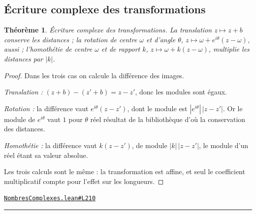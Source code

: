 \documentclass[11pt,a4paper]{article}
\theoremstyle{definition}
\theoremstyle{plain}
\newtheorem{theoreme}{Théorème}
\newcommand{\source}[2]{\par\smallskip\noindent\hfill{\footnotesize\href{#1}{\texttt{#2}}}\par\smallskip}
\begin{document}
\subsection{Écriture complexe des transformations}

\begin{theoreme}
Écriture complexe des transformations. La translation $z \mapsto z + b$ conserve les
distances ; la rotation de centre $\omega$ et d'angle $\theta$, $z \mapsto \omega +
e^{i\theta}(z - \omega)$, aussi ; l'homothétie de centre $\omega$ et de rapport $k$,
$z \mapsto \omega + k(z - \omega)$, multiplie les distances par $|k|$.
\end{theoreme}

\begin{proof}
Dans les trois cas on calcule la différence des images.

\emph{Translation :} $(z + b) - (z' + b) = z - z'$, donc les modules sont égaux.

\emph{Rotation :} la différence vaut $e^{i\theta}(z - z')$, dont le module est
$|e^{i\theta}|\,|z - z'|$. Or le module de $e^{i\theta}$ vaut $1$ pour $\theta$ réel
\textemdash{} résultat de la bibliothèque \textemdash{} d'où la conservation des distances.

\emph{Homothétie :} la différence vaut $k(z - z')$, de module $|k|\,|z - z'|$, le module
d'un réel étant sa valeur absolue.

\medskip\noindent
Les trois calculs sont le même : la transformation est affine, et seul le coefficient
multiplicatif compte pour l'effet sur les longueurs.
\end{proof}
\source{https://github.com/Commutator-IO/learn-lean/blob/main/cours/02-lycee/07-nombres-complexes/NombresComplexes.lean\#L210}{NombresComplexes.lean\#L210}

\vfill
\noindent\rule{0.35\linewidth}{0.4pt}\par
{}
\end{document}
